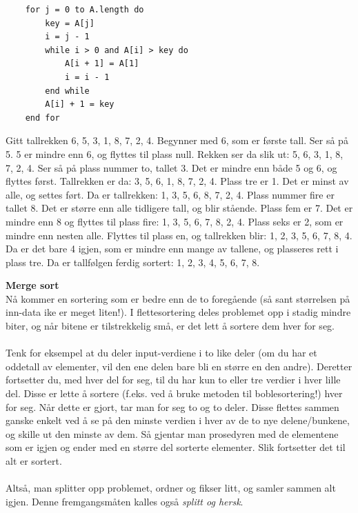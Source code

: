 \begin{lstlisting}
    for j = 0 to A.length do
	    key = A[j]
	    i = j - 1
	    while i > 0 and A[i] > key do
	    	A[i + 1] = A[1]
	    	i = i - 1
	    end while
	    A[i] + 1 = key
    end for
\end{lstlisting}

\begin{boxed}
Gitt tallrekken 6, 5, 3, 1, 8, 7, 2, 4. Begynner med 6, som er første tall. Ser så på 5. 5 er mindre enn 6, og flyttes til plass null. Rekken ser da slik ut: 5, 6, 3, 1, 8, 7, 2, 4. Ser så på plass nummer to, tallet 3. Det er mindre enn både 5 og 6, og flyttes først. Tallrekken er da: 3, 5, 6, 1, 8, 7, 2, 4. Plass tre er 1. Det er minst av alle, og settes ført. Da er tallrekken: 1, 3, 5, 6, 8, 7, 2, 4. Plass nummer fire er tallet 8. Det er større enn alle tidligere tall, og blir stående. Plass fem er 7. Det er mindre enn 8 og flyttes til plass fire: 1, 3, 5, 6, 7, 8, 2, 4. Plass seks er 2, som er mindre enn nesten alle. Flyttes til plass en, og tallrekken blir: 1, 2, 3, 5, 6, 7, 8, 4. Da er det bare 4 igjen, som er mindre enn mange av tallene, og plasseres rett i plass tre. Da er tallfølgen ferdig sortert: 1, 2, 3, 4, 5, 6, 7, 8.
\end{boxed}

\noindent \textbf{Merge sort}\\
Nå kommer en sortering som er bedre enn de to foregående (så sant størrelsen på inn-data ike er meget liten!). I flettesortering deles problemet opp i stadig mindre biter, og når bitene er tilstrekkelig små, er det lett å sortere dem hver for seg.
\\\\
Tenk for eksempel at du deler input-verdiene i to like deler (om du har et oddetall av elementer, vil den ene delen bare bli en større en den andre). Deretter fortsetter du, med hver del for seg, til du har kun to eller tre verdier i hver lille del. Disse er lette å sortere (f.eks. ved å bruke metoden til boblesortering!) hver for seg. Når dette er gjort, tar man for seg to og to deler. Disse flettes sammen ganske enkelt ved å se på den minste verdien i hver av de to nye delene/bunkene, og skille ut den minste av dem. Så gjentar man prosedyren med de elementene som er igjen og ender med en større del sorterte elementer. Slik fortsetter det til alt er sortert.
\\\\
Altså, man splitter opp problemet, ordner og fikser litt, og samler sammen alt igjen. Denne fremgangsmåten kalles også \textit{splitt og hersk}.

